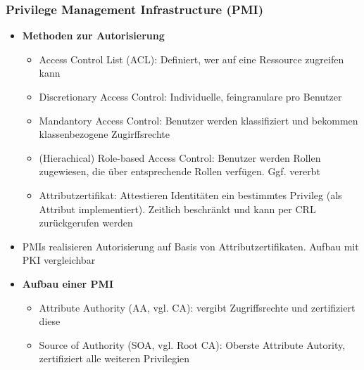 \subsubsection{Privilege Management Infrastructure (PMI)}
\begin{itemize}
	\item \textbf{Methoden zur Autorisierung}
	\begin{itemize}
		\item Access Control List (ACL): Definiert, wer auf eine Ressource zugreifen kann
		\item Discretionary Access Control: Individuelle, feingranulare pro Benutzer
		\item Mandantory Access Control: Benutzer werden klassifiziert und bekommen klassenbezogene Zugirffsrechte
		\item (Hierachical) Role-based Access Control: Benutzer werden Rollen zugewiesen, die über entsprechende Rollen verfügen. Ggf. vererbt
		\item Attributzertifikat: Attestieren Identitäten ein bestimmtes Privileg (als Attribut implementiert). Zeitlich beschränkt und kann per CRL zurückgerufen werden
	\end{itemize}
	\item PMIs realisieren Autorisierung auf Basis von Attributzertifikaten. Aufbau mit PKI vergleichbar
	\item \textbf{Aufbau einer PMI}
	\begin{itemize}
		\item Attribute Authority (AA, vgl. CA): vergibt Zugriffsrechte und zertifiziert diese
		\item Source of Authority (SOA, vgl. Root CA): Oberste Attribute Autority, zertifiziert alle weiteren Privilegien
	\end{itemize}
\end{itemize}


